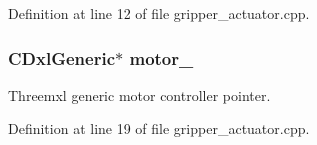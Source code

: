 Definition at line 12 of file gripper\-\_\-actuator.\-cpp.

\subsubsection[{motor\-\_\-}]{\setlength{\rightskip}{0pt plus 5cm}C\-Dxl\-Generic$\ast$ motor\-\_\-}\label{gripper__actuator_8cpp_ac1874704ed544a18b8fc45cd2abacecc}
Threemxl generic motor controller pointer. 

Definition at line 19 of file gripper\-\_\-actuator.\-cpp.

